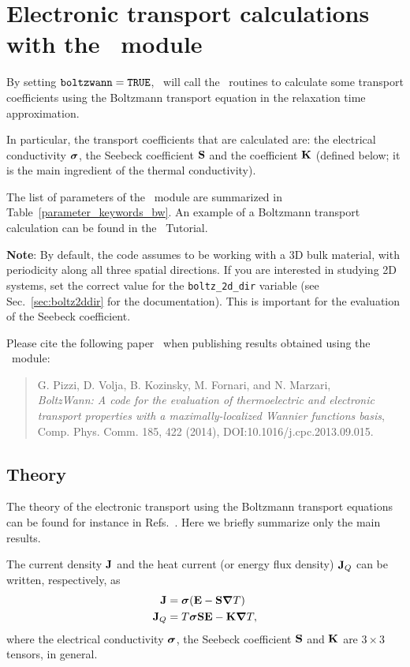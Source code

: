 \chapter{Electronic transport calculations with the \bw\ module}\label{ch:boltzwann}

By setting $\verb#boltzwann#=\verb#TRUE#$, \postw\ will call the \bw\ routines to calculate some transport coefficients using the Boltzmann transport equation in the relaxation time approximation.

In particular, the transport coefficients that are calculated are: the electrical conductivity $\bm{\mathrm{\sigma}}$, the Seebeck coefficient $\bm{\mathrm{S}}$ and the coefficient $\bm{\mathrm{K}}$ (defined below; it is the main ingredient of the thermal conductivity).

The list of parameters of the \bw\ module are summarized in Table~\ref{parameter_keywords_bw}.
An example of a Boltzmann transport calculation can be found in the \wannier\ Tutorial.

\textbf{Note}: By default, the code assumes to be working with a 3D bulk material, with periodicity along all three spatial directions. If you are interested in studying 2D systems, set the correct value for the \texttt{boltz\_2d\_dir} variable (see Sec.~\ref{sec:boltz2ddir} for the documentation). This is important for the evaluation of the Seebeck coefficient.

Please cite the following paper~\cite{pizzi-cpc14} when publishing results obtained using the \bw\  module:
\begin{quote}
G. Pizzi, D. Volja, B. Kozinsky, M. Fornari, and N. Marzari, \\
\emph{BoltzWann: A code for the evaluation of thermoelectric and electronic transport properties with a maximally-localized Wannier functions basis},\\
Comp. Phys. Comm. 185, 422 (2014), DOI:10.1016/j.cpc.2013.09.015.
\end{quote}

\section{Theory}
\label{sec:boltzwann-theory}
The theory of the electronic transport using the Boltzmann transport equations can be found for instance in Refs.~\cite{ziman-book72,grosso-book00,mahan-itc06}. Here we briefly summarize only the main results.

The current density $\bm{\mathrm{J}}$ and the heat current (or energy flux density) $\bm{\mathrm{J}}_Q$ can be written, respectively, as
\begin{align}
  \bm{\mathrm{J}}   &= \bm{\mathrm{\sigma}}(\bm{\mathrm{E}} - \bm{\mathrm{S}} \bm{\mathrm{\nabla}} T) \\
  \bm{\mathrm{J}}_Q &= T \bm{\mathrm{\sigma}} \bm{\mathrm{S}} \bm{\mathrm{E}} - \bm{\mathrm{K}} \bm{\mathrm{\nabla}} T,
\end{align}
where the electrical conductivity $\bm{\mathrm{\sigma}}$, the Seebeck coefficient $\bm{\mathrm{S}}$ and $\bm{\mathrm{K}}$ are $3\times 3$ tensors, in general.

